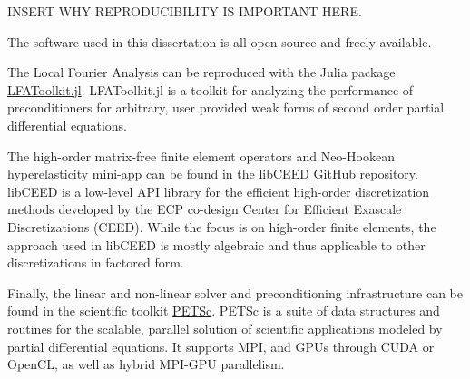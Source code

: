 INSERT WHY REPRODUCIBILITY IS IMPORTANT HERE.

The software used in this dissertation is all open source and freely available.

The Local Fourier Analysis can be reproduced with the Julia package \href{https://www.github.com/jeremylt/LFAToolkit.jl}{LFAToolkit.jl}. LFAToolkit.jl is a toolkit for analyzing the performance of preconditioners for arbitrary, user provided weak forms of second order partial differential equations.

The high-order matrix-free finite element operators and Neo-Hookean hyperelasticity mini-app can be found in the \href{https://www.github.com/CEED/libCEED}{libCEED} GitHub repository.
libCEED is a low-level API library for the efficient high-order discretization methods developed by the ECP co-design Center for Efficient Exascale Discretizations (CEED). While the focus is on high-order finite elements, the approach used in libCEED is mostly algebraic and thus applicable to other discretizations in factored form.

Finally, the linear and non-linear solver and preconditioning infrastructure can be found in the scientific toolkit \href{https://www.mcs.anl.gov/petsc/}{PETSc}.
PETSc is a suite of data structures and routines for the scalable, parallel solution of scientific applications modeled by partial differential equations. It supports MPI, and GPUs through CUDA or OpenCL, as well as hybrid MPI-GPU parallelism.
